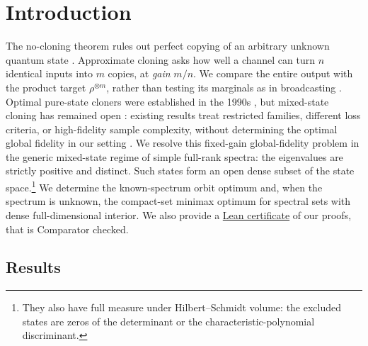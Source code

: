 \documentclass[11pt]{article}
\theoremstyle{remark}
\theoremstyle{plain}
\newcommand{\ot}{\otimes}
\begin{document}
\clearpage
\tableofcontents

\section{Introduction}\label{sec:introduction-results}

The no-cloning theorem rules out perfect copying of an arbitrary unknown
quantum state \cite{WoottersZurek1982,Dieks1982}.  Approximate cloning asks
how well a channel can turn \(n\) identical inputs into \(m\) copies, at
\emph{gain} \(m/n\).  We compare the entire output with the product
target \(\rho^{\ot m}\), rather than testing its marginals as in broadcasting
\cite{BarnumCavesFuchsJozsaSchumacher1996}.  Optimal pure-state cloners
were established in the 1990s \cite{Werner1998,KeylWerner1999}, but
mixed-state cloning has remained open
\cite{ScaraniIblisdirGisinAcin2005}: existing results treat restricted
families, different loss criteria, or high-fidelity sample complexity,
without determining the optimal global fidelity in our setting
\cite{BuscemiDArianoMacchiavelloPerinotti2005Optimal,BuscemiDArianoMacchiavelloPerinotti2006,DangFan2007,FanLiuShi2007,Kazakov2007,LiTheilHarrowChuang2026,FanizzaGrinkoScharnhorstSpilecki2026,JeonSohnOh2026}.
We resolve this fixed-gain global-fidelity problem in the generic
mixed-state regime of simple full-rank spectra: the eigenvalues are
strictly positive and distinct.  Such states form an open dense
subset of the state space.\footnote{They also have full measure under
Hilbert--Schmidt volume: the excluded states are zeros of the determinant
or the characteristic-polynomial discriminant.}  We determine the
known-spectrum orbit optimum and, when the spectrum is unknown, the
compact-set minimax optimum for spectral sets with dense full-dimensional
interior. We also provide a \href{https://github.com/JWang226/Cloning}{Lean certificate} of our proofs, that is Comparator checked.

\subsection{Results}\label{sec:main-results}
\end{document}

